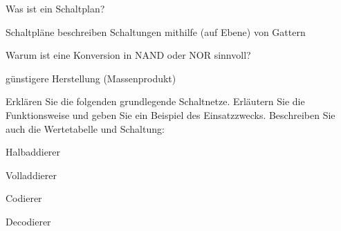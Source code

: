 \documentclass
[
  draft    = true,
  fontsize = 11pt,
  parskip  = half-,
  BCOR     = 0pt,
  DIV      = 11,
  ngerman,
  dvipsnames
]
{scrartcl}
\begin{document}
\begin{mytemize}
  \item Was ist ein Schaltplan?
        \begin{achim}
          \begin{mytemize}
            \item Schaltpläne beschreiben Schaltungen mithilfe (auf Ebene) von Gattern
          \end{mytemize}
        \end{achim}
  \item Warum ist eine Konversion in NAND oder NOR sinnvoll?
        \begin{achim}
          \begin{mytemize}
            \item günstigere Herstellung (Massenprodukt)
          \end{mytemize}
        \end{achim}
  \item Erklären Sie die folgenden grundlegende Schaltnetze. Erläutern
        Sie die Funktionsweise und geben Sie ein Beispiel des Einsatzzwecks.
        Beschreiben Sie auch die Wertetabelle und Schaltung:
        \begin{mytemize}
          \item Halbaddierer
                \begin{achim}
                  \begin{mytemize}
                    \item 
                  \end{mytemize}
                \end{achim}
          \item Volladdierer
                \begin{achim}
                  \begin{mytemize}
                    \item 
                  \end{mytemize}
                \end{achim}
          \item Codierer
                \begin{achim}
                  \begin{mytemize}
                    \item 
                  \end{mytemize}
                \end{achim}
          \item Decodierer
                \begin{achim}

\end{achim}
\end{mytemize}
\end{mytemize}
\end{document}
